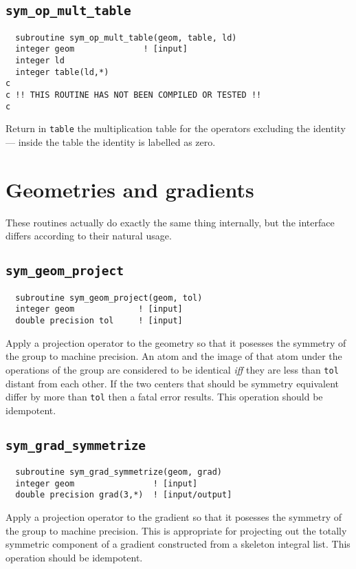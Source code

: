\subsection{{\tt sym\_op\_mult\_table}}
\begin{verbatim}
  subroutine sym_op_mult_table(geom, table, ld)
  integer geom              ! [input]
  integer ld
  integer table(ld,*)
c
c !! THIS ROUTINE HAS NOT BEEN COMPILED OR TESTED !!
c
\end{verbatim}
Return in \verb+table+ the multiplication table for the operators
excluding the identity --- inside the table the identity is labelled
as zero.

\section{Geometries and gradients}

These routines actually do exactly the same thing internally, but the
interface differs according to their natural usage.

\subsection{{\tt sym\_geom\_project}}
\begin{verbatim}
  subroutine sym_geom_project(geom, tol)
  integer geom             ! [input]
  double precision tol     ! [input]
\end{verbatim}
Apply a projection operator to the geometry so that it posesses the
symmetry of the group to machine precision.  An atom and the image of
that atom under the operations of the group are considered to be
identical {\em iff} they are less than \verb+tol+ distant from each
other.  If the two centers that should be symmetry equivalent differ
by more than \verb+tol+ then a fatal error results.  This operation
should be idempotent.

\subsection{{\tt sym\_grad\_symmetrize}}
\begin{verbatim}
  subroutine sym_grad_symmetrize(geom, grad)
  integer geom                ! [input]
  double precision grad(3,*)  ! [input/output]
\end{verbatim}
Apply a projection operator to the gradient so that it posesses the
symmetry of the group to machine precision.  This is appropriate for
projecting out the totally symmetric component of a gradient
constructed from a skeleton integral list.  This operation should be
idempotent. 

